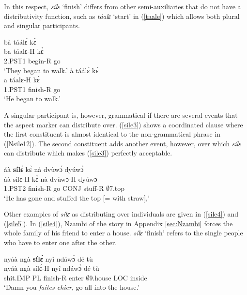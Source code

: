 In this respect, {\itshape sílɛ} `finish' differs from other semi-auxiliaries that do not have a distributivity function, such as {\itshape táalɛ} `start' in (\ref{taale}) which allows both plural and singular participants.

\begin{exe}
\ex\label{taale}
\begin{xlist}
\ex \label{taale1}
  \glll  bà táálɛ́ kɛ̀ \\
          ba táalɛ-H kɛ̀ \\
         2.PST1 begin-R go  \\
    \trans `They began to walk.'
\ex\label{taale2}
  \glll   à táálɛ́ kɛ̀\\
           a táalɛ-H kɛ̀\\
          1.PST1 finish-R go \\
    \trans `He began to walk.'
\end{xlist}
\end{exe}


\noindent A singular participant is, however, grammatical if there are several events that the aspect marker can distribute over. (\ref{sile3}) shows a coordinated clause where the first constituent is almost identical to the non-grammatical phrase in (\ref{Nsile12}). The second constituent adds another event, however, over which {\itshape sílɛ} can distribute which makes (\ref{sile3}) perfectly acceptable.

\begin{exe} 
\ex\label{sile3}
  \glll áà {\bfseries sílɛ́} kɛ̀ nà dvùwɔ́ dyúwɔ̀\\
     áà sílɛ-H kɛ̀ nà dvùwɔ-H dyúwɔ \\
        1.PST2 finish-R go CONJ stuff-R $\emptyset$7.top \\
    \trans `He has gone and stuffed the top [= with straw],'
\end{exe}

Other examples of {\itshape sílɛ} as distributing over individuals are given in (\ref{sile4}) and (\ref{sile5}). In (\ref{sile4}), Nzambi of the story in Appendix \ref{sec:Nzambi} forces the whole family of his friend to enter a house. {\itshape sílɛ} `finish' refers to the single people who have to enter one after the other.

\begin{exe} 
\ex\label{sile4}
  \glll nyáà ngà {\bfseries sílɛ́} nyî ndáwɔ̀ dé tù \\
       nyáà ngà sílɛ́-H nyî ndáwɔ̀ dé tù \\
       shit.IMP PL finish-R enter $\emptyset$9.house LOC inside  \\
    \trans `Damn you {\itshape faites chier}, go all into the house.'
\end{exe}

